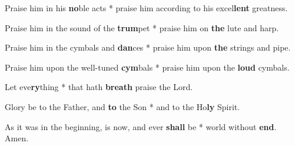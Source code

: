 \begin{multicols}{2}
	Praise him in his \textbf{no}ble acts * praise him according to his excel\textbf{lent} greatness.
	
	Praise him in the sound of the \textbf{trum}pet * praise him on \textbf{the} lute and harp.
	
	Praise him in the cymbals and \textbf{dan}ces * praise him upon \textbf{the} strings and pipe.
	
	Praise him upon the well-tuned \textbf{cym}bals * praise him upon the \textbf{loud} cymbals.
	
	Let eve\textbf{ry}thing * that hath \textbf{breath} praise the Lord.
	
	Glory be to the Father, and \textbf{to} the Son * and to the Ho\textbf{ly} Spirit.
	
	As it was in the beginning, is now, and ever \textbf{shall} be * world without \textbf{end}. Amen.
\end{multicols}